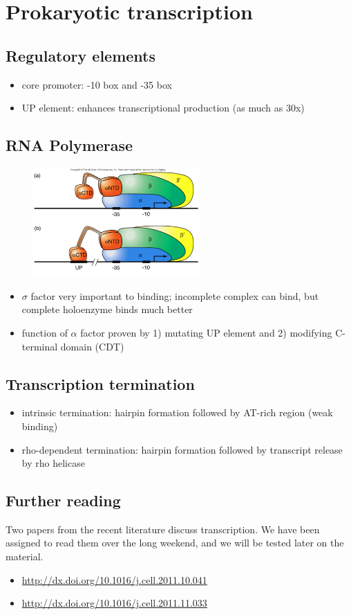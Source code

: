 \documentclass[10pt]{article}
\newenvironment{mitemize}
{
  \begin{itemize}
  \setlength{\itemsep}{1pt}
  \setlength{\parskip}{0pt}
  \setlength{\parsep}{0pt}}{\end{itemize}
}
\begin{document}
\section*{Prokaryotic transcription}

\subsection*{Regulatory elements}
\begin{mitemize}
  \item core promoter: -10 box and -35 box
  \item UP element: enhances transcriptional production (as much as 30x)
\end{mitemize}

\subsection*{RNA Polymerase}
\begin{figure}[h] \centering
  \includegraphics[width=240px]{rna-pol-holoenzyme.jpg}
\end{figure}
\begin{mitemize}
  \item $\sigma$ factor very important to binding; incomplete complex can bind, but complete holoenzyme binds much better
  \item function of $\alpha$ factor proven by 1) mutating UP element and 2) modifying C-terminal domain (CDT)
\end{mitemize}

\subsection*{Transcription termination}
\begin{mitemize}
  \item intrinsic termination: hairpin formation followed by AT-rich region (weak binding)
  \item rho-dependent termination: hairpin formation followed by transcript release by rho helicase
\end{mitemize}

\subsection*{Further reading}
Two papers from the recent literature discuss transcription.
We have been assigned to read them over the long weekend, and we will be tested later on the material.
\begin{mitemize}
  \item \url{http://dx.doi.org/10.1016/j.cell.2011.10.041}
  \item \url{http://dx.doi.org/10.1016/j.cell.2011.11.033}
\end{mitemize}
\end{document}
